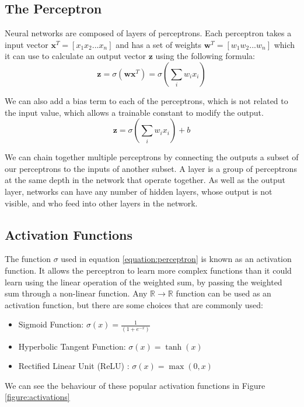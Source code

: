 \documentclass[12pt,a4paper,twoside,openright]{report}
\begin{document}
\subsection{The Perceptron}
Neural networks are composed of layers of perceptrons. Each perceptron takes a input vector $\textbf{x}^T = [x_1  x_2  ...  x_n]$ and has a set of weights $\textbf{w}^T = [w_1  w_2  ...  w_n]$ which it can use to calculate an output vector $\textbf{z}$ using the following formula:
\begin{equation}
    \label{equation:perceptron}
    \textbf{z} = \sigma(\textbf{w}\textbf{x}^T) = \sigma(\sum_i w_i x_i)
\end{equation}
 
We can also add a bias term to each of the perceptrons, which is not related to the input value, which allows a trainable constant to modify the output. 
\begin{equation}
    \label{equation:perceptron2}
    \textbf{z} = \sigma(\sum_i w_i x_i) + b
\end{equation}
 

 
We can chain together multiple perceptrons by connecting the outputs a subset of our perceptrons to the inputs of another subset. A layer is a group of perceptrons at the same depth in the network that operate together. As well as the output layer, networks can have any number of hidden layers, whose output is not visible, and who feed into other layers in the network.

\subsection{Activation Functions}
The function $\sigma$ used in equation \ref{equation:perceptron} is known as an activation function. It allows the perceptron to learn more complex functions than it could learn using the linear operation of the weighted sum, by passing the weighted sum through a non-linear function. Any $\mathbb{R} \rightarrow \mathbb{R} $ function can be used as an activation function, but there are some choices that are commonly used:
\begin{itemize}
    \item Sigmoid Function: $\sigma (x) = \frac{1}{(1+e^{-x})}$
    \item Hyperbolic Tangent Function: $\sigma (x) = \tanh(x)$
    \item Rectified Linear Unit (ReLU) : $\sigma (x) = \max(0, x)$
\end{itemize}
We can see the behaviour of these popular activation functions in Figure \ref{figure:activations}
\end{document}
